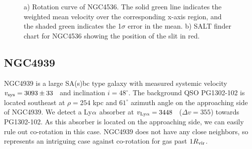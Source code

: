 \begin{figure}[h!]
\centering
  \caption{\small{a) Rotation curve of NGC4536. The solid green line indicates the weighted mean velocity over the corresponding x-axis region, and the shaded green indicates the 1$\sigma$ error in the mean. b) SALT finder chart for NGC4536 showing the position of the slit in red.}}
\vspace{0pt}
\end{figure}






\subsection{NGC4939}
NGC4939 is a large SA(s)bc type galaxy with measured systemic velocity $v_{\rm sys} = 3093 \pm 33$ \kms~and inclination $i = 48^{\circ}$. The background QSO PG1302-102 is located southeast at $\rho = 254$ kpc and $61^{\circ}$ azimuth angle on the approaching side of NGC4939. We detect a Ly$\rm \alpha$ absorber at $v_{\rm Ly\alpha} = 3448$ \kms~($\Delta v = 355$\kms) towards PG1302-102. As this absorber is located on the approaching side, we can easily rule out co-rotation in this case. NGC4939 does not have any close neighbors, so represents an intriguing case against co-rotation for gas past $1 R_{\rm vir}$.

